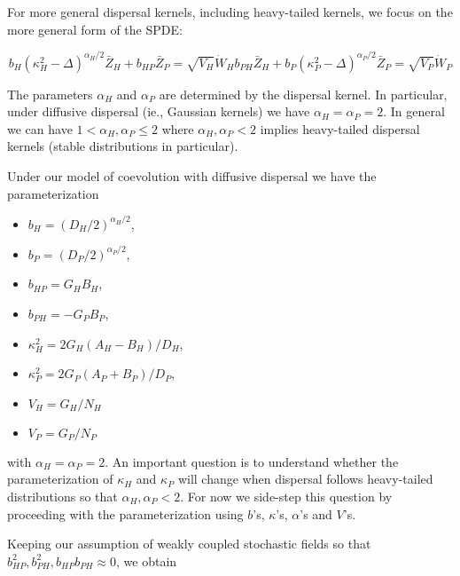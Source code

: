 \documentclass{article}
\begin{document}
For more general dispersal kernels, including heavy-tailed kernels, we
focus on the more general form of the SPDE:

\begin{subequations}
  \begin{equation}
    b_H(\kappa_H^2-\Delta)^{\alpha_H/2}\bar Z_H + b_{HP}\bar Z_P = \sqrt{V_H}\dot W_H
  \end{equation}
  \begin{equation}
    b_{PH}\bar Z_H + b_P(\kappa_P^2-\Delta)^{\alpha_P/2}\bar Z_P = \sqrt{V_P}\dot W_P
  \end{equation}
\end{subequations}

The parameters \(\alpha_H\) and \(\alpha_P\) are determined by the
dispersal kernel. In particular, under diffusive dispersal (ie.,
Gaussian kernels) we have \(\alpha_H=\alpha_P=2\). In general we can
have \(1<\alpha_H,\alpha_P\leq2\) where \(\alpha_H,\alpha_P<2\) implies
heavy-tailed dispersal kernels (stable distributions in particular).

Under our model of coevolution with diffusive dispersal we have the
parameterization

\begin{itemize}
\tightlist
\item
  \(b_H=(D_H/2)^{\alpha_H/2}\),
\item
  \(b_P=(D_P/2)^{\alpha_P/2}\),
\item
  \(b_{HP}=G_HB_H\),
\item
  \(b_{PH}=-G_PB_P\),
\item
  \(\kappa_H^2=2G_H(A_H-B_H)/D_H\),
\item
  \(\kappa_P^2=2G_P(A_P+B_P)/D_P\),
\item
  \(V_H=G_H/N_H\)
\item
  \(V_P=G_P/N_P\)
\end{itemize}

with \(\alpha_H=\alpha_P=2\). An important question is to understand
whether the parameterization of \(\kappa_H\) and \(\kappa_P\) will
change when dispersal follows heavy-tailed distributions so that
\(\alpha_H,\alpha_P<2\). For now we side-step this question by
proceeding with the parameterization using \(b\)'s, \(\kappa\)'s,
\(\alpha\)'s and \(V\)'s.

Keeping our assumption of weakly coupled stochastic fields so that
\(b_{HP}^2,b_{PH}^2,b_{HP}b_{PH}\approx0\), we obtain
\end{document}
